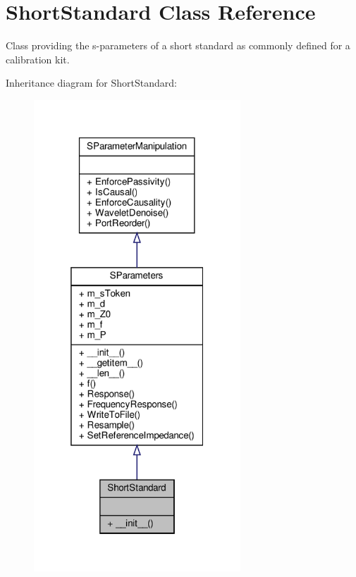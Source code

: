 \hypertarget{classSignalIntegrity_1_1Measurement_1_1CalKit_1_1Standards_1_1ShortStandard_1_1ShortStandard}{}\section{Short\+Standard Class Reference}
\label{classSignalIntegrity_1_1Measurement_1_1CalKit_1_1Standards_1_1ShortStandard_1_1ShortStandard}


Class providing the s-\/parameters of a short standard as commonly defined for a calibration kit.  




Inheritance diagram for Short\+Standard\+:
\nopagebreak
\begin{figure}[H]
\begin{center}
\leavevmode
\includegraphics[width=220pt]{classSignalIntegrity_1_1Measurement_1_1CalKit_1_1Standards_1_1ShortStandard_1_1ShortStandard__inherit__graph}
\end{center}
\end{figure}


